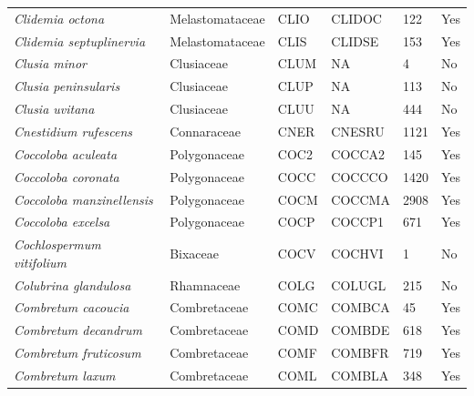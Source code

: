 \documentclass[11pt]{article}
\begin{document}
\begin{longtable}{@{}llllll@{}}
\textit{Clidemia octona}                              & Melastomataceae  & CLIO   & CLIDOC & 122             & Yes       \\
\textit{Clidemia septuplinervia}                      & Melastomataceae  & CLIS   & CLIDSE & 153             & Yes       \\
\textit{Clusia minor}                                 & Clusiaceae       & CLUM   & NA     & 4               & No        \\
\textit{Clusia peninsularis}                          & Clusiaceae       & CLUP   & NA     & 113             & No        \\
\textit{Clusia uvitana}                               & Clusiaceae       & CLUU   & NA     & 444             & No        \\
\textit{Cnestidium rufescens}                         & Connaraceae      & CNER   & CNESRU & 1121            & Yes       \\
\textit{Coccoloba aculeata}                           & Polygonaceae     & COC2   & COCCA2 & 145             & Yes       \\
\textit{Coccoloba coronata}                           & Polygonaceae     & COCC   & COCCCO & 1420            & Yes       \\
\textit{Coccoloba manzinellensis}                     & Polygonaceae     & COCM   & COCCMA & 2908            & Yes       \\
\textit{Coccoloba excelsa}                            & Polygonaceae     & COCP   & COCCP1 & 671             & Yes       \\
\textit{Cochlospermum vitifolium}                     & Bixaceae         & COCV   & COCHVI & 1               & No        \\
\textit{Colubrina glandulosa}                         & Rhamnaceae       & COLG   & COLUGL & 215             & No        \\
\textit{Combretum cacoucia}                           & Combretaceae     & COMC   & COMBCA & 45              & Yes       \\
\textit{Combretum decandrum}                          & Combretaceae     & COMD   & COMBDE & 618             & Yes       \\
\textit{Combretum fruticosum}                         & Combretaceae     & COMF   & COMBFR & 719             & Yes       \\
\textit{Combretum laxum}                              & Combretaceae     & COML   & COMBLA & 348             & Yes       \\

\end{longtable}
\end{document}
